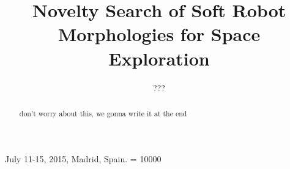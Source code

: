 \documentclass{sig-alternate}
\begin{document}
  {July 11-15, 2015, Madrid, Spain.}
    \widowpenalty = 10000

\title{Novelty Search of Soft Robot Morphologies for Space Exploration}

\author{
\alignauthor
???
}

\maketitle
\begin{abstract}
don't worry about this, we gonna write it at the end
\end{abstract}
\end{document}

